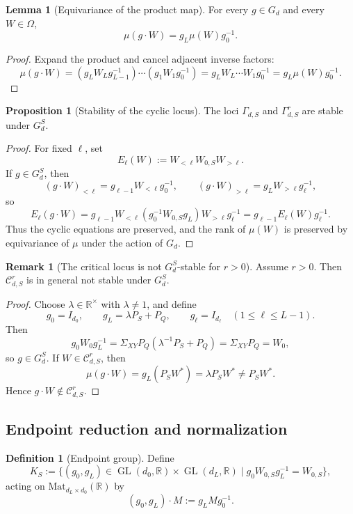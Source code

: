 \documentclass[11pt]{article}
\newcommand{\GL}{\operatorname{GL}}
\newcommand{\Mat}{\mathrm{Mat}}
\newcommand{\R}{\mathbb{R}}
\theoremstyle{definition}
\newtheorem{proposition}[theorem]{Proposition}
\newtheorem{lemma}[theorem]{Lemma}
\newtheorem{definition}[theorem]{Definition}
\newtheorem{remark}[theorem]{Remark}
\begin{document}
\begin{lemma}[Equivariance of the product map]
For every \(g\in G_d\) and every \(W\in \Omega\),
\[
\mu(g\cdot W)=g_L\mu(W)g_0^{-1}.
\]
\end{lemma}

\begin{proof}
Expand the product and cancel adjacent inverse factors:
\[
\mu(g\cdot W)
=(g_LW_Lg_{L-1}^{-1})\cdots (g_1W_1g_0^{-1})
=g_LW_L\cdots W_1g_0^{-1}
=g_L\mu(W)g_0^{-1}.
\]
\end{proof}

\begin{proposition}[Stability of the cyclic locus]
The loci \(\Gamma_{d,S}\) and \(\Gamma_{d,S}^r\) are stable under
\(G_d^{S}\).
\end{proposition}

\begin{proof}
For fixed \(\ell\), set
\[
E_\ell(W):=W_{<\ell}W_{0,S}W_{>\ell}.
\]
If \(g\in G_d^{S}\), then
\[
(g\cdot W)_{<\ell}=g_{\ell-1}W_{<\ell}g_0^{-1},
\qquad
(g\cdot W)_{>\ell}=g_LW_{>\ell}g_\ell^{-1},
\]
so
\[
E_\ell(g\cdot W)
=
g_{\ell-1}W_{<\ell}(g_0^{-1}W_{0,S}g_L)W_{>\ell}g_\ell^{-1}
=
g_{\ell-1}E_\ell(W)g_\ell^{-1}.
\]
Thus the cyclic equations are preserved, and the rank of \(\mu(W)\) is preserved
by equivariance of \(\mu\) under the action of $G_d$.
\end{proof}

\begin{remark}[The critical locus is not \(G_d^{S}\)-stable for \(r>0\)]
Assume \(r>0\). Then \(\mathcal C_{d,S}^r\) is in general not stable under
\(G_d^{S}\).
\end{remark}

\begin{proof}
Choose \(\lambda\in \R^\times\) with \(\lambda\neq 1\), and define
\[
g_0=I_{d_0},
\qquad
g_L=\lambda P_S+P_Q,
\qquad
g_\ell=I_{d_\ell}\quad (1\leq \ell\leq L-1).
\]
Then
\[
g_0W_0g_L^{-1}
=
\Sigma_{XY}P_Q(\lambda^{-1}P_S+P_Q)
=
\Sigma_{XY}P_Q
=
W_0,
\]
so \(g\in G_d^{S}\). If \(W\in \mathcal C_{d,S}^r\), then
\[
\mu(g\cdot W)=g_L(P_SW^\ast)=\lambda P_SW^\ast\neq P_SW^\ast.
\]
Hence \(g\cdot W\notin \mathcal C_{d,S}^r\).
\end{proof}

\subsection{Endpoint reduction and normalization}

\begin{definition}[Endpoint group]
Define
\[
K_S
:=
\{(g_0,g_L)\in \GL(d_0,\R)\times \GL(d_L,\R)\mid g_0W_{0,S}g_L^{-1}=W_{0,S}\},
\]
acting on \(\Mat_{d_L\times d_0}(\R)\) by
\[
(g_0,g_L)\cdot M:=g_LMg_0^{-1}.
\]
\end{definition}
\end{document}
